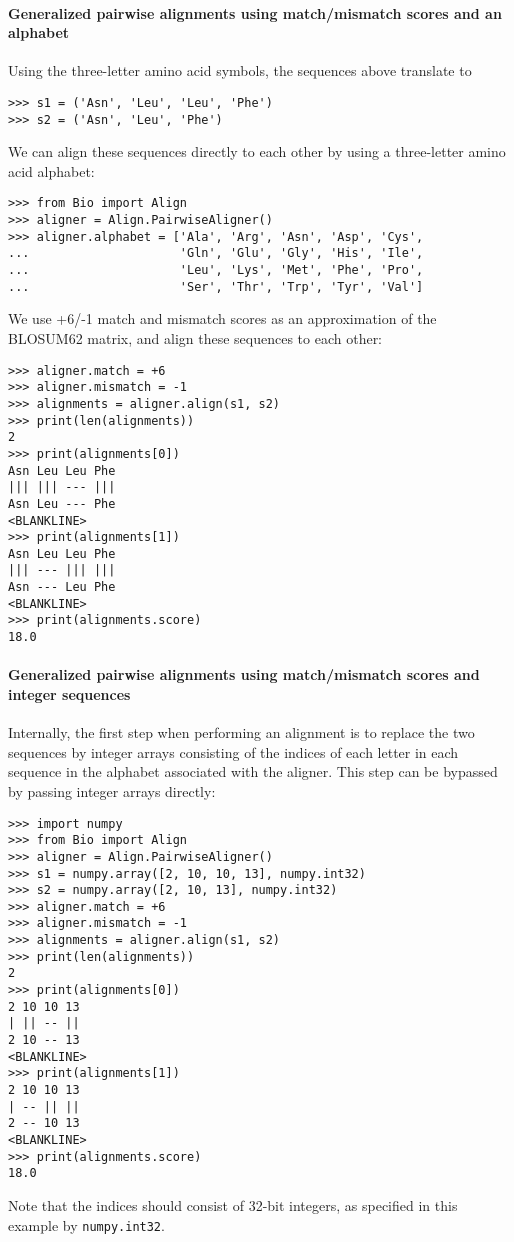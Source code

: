 \paragraph*{Generalized pairwise alignments using match/mismatch scores and an alphabet}

Using the three-letter amino acid symbols, the sequences above translate to

\begin{verbatim}
>>> s1 = ('Asn', 'Leu', 'Leu', 'Phe')
>>> s2 = ('Asn', 'Leu', 'Phe')
\end{verbatim}
We can align these sequences directly to each other by using a three-letter amino acid alphabet:

\begin{verbatim}
>>> from Bio import Align
>>> aligner = Align.PairwiseAligner()
>>> aligner.alphabet = ['Ala', 'Arg', 'Asn', 'Asp', 'Cys',
...                     'Gln', 'Glu', 'Gly', 'His', 'Ile',
...                     'Leu', 'Lys', 'Met', 'Phe', 'Pro',
...                     'Ser', 'Thr', 'Trp', 'Tyr', 'Val']
\end{verbatim}
We use +6/-1 match and mismatch scores as an approximation of the BLOSUM62 matrix, and align these sequences to each other:

\begin{verbatim}
>>> aligner.match = +6
>>> aligner.mismatch = -1
>>> alignments = aligner.align(s1, s2)
>>> print(len(alignments))
2
>>> print(alignments[0])
Asn Leu Leu Phe
||| ||| --- |||
Asn Leu --- Phe
<BLANKLINE>
>>> print(alignments[1])
Asn Leu Leu Phe
||| --- ||| |||
Asn --- Leu Phe
<BLANKLINE>
>>> print(alignments.score)
18.0
\end{verbatim}

\paragraph*{Generalized pairwise alignments using match/mismatch scores and integer sequences}

Internally, the first step when performing an alignment is to replace the two sequences by integer arrays consisting of the indices of each letter in each sequence in the alphabet associated with the aligner. This step can be bypassed by passing integer arrays directly:

\begin{verbatim}
>>> import numpy
>>> from Bio import Align
>>> aligner = Align.PairwiseAligner()
>>> s1 = numpy.array([2, 10, 10, 13], numpy.int32)
>>> s2 = numpy.array([2, 10, 13], numpy.int32)
>>> aligner.match = +6
>>> aligner.mismatch = -1
>>> alignments = aligner.align(s1, s2)
>>> print(len(alignments))
2
>>> print(alignments[0])
2 10 10 13
| || -- ||
2 10 -- 13
<BLANKLINE>
>>> print(alignments[1])
2 10 10 13
| -- || ||
2 -- 10 13
<BLANKLINE>
>>> print(alignments.score)
18.0
\end{verbatim}
Note that the indices should consist of 32-bit integers, as specified in this example by \verb+numpy.int32+.

